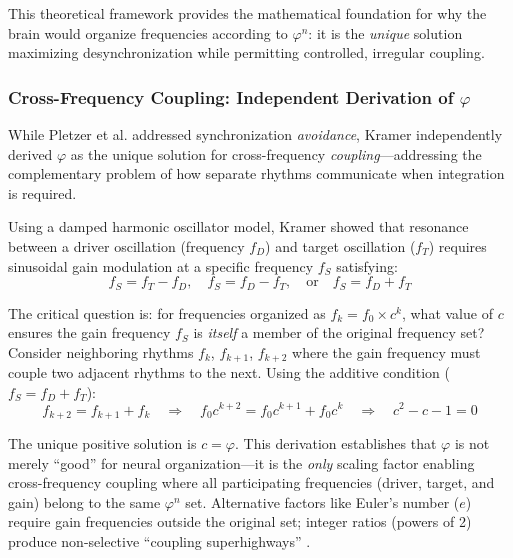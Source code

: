 \documentclass[11pt,a4paper]{article}
\newcommand{\phisym}{\varphi}
\begin{document}
This theoretical framework provides the mathematical foundation for why the brain would organize frequencies according to $\phisym^n$: it is the \textit{unique} solution maximizing desynchronization while permitting controlled, irregular coupling.

\subsubsection{Cross-Frequency Coupling: Independent Derivation of $\phisym$}

While Pletzer et al. addressed synchronization \textit{avoidance}, Kramer \parencite{kramer2022golden} independently derived $\phisym$ as the unique solution for cross-frequency \textit{coupling}---addressing the complementary problem of how separate rhythms communicate when integration is required.

Using a damped harmonic oscillator model, Kramer showed that resonance between a driver oscillation (frequency $f_D$) and target oscillation ($f_T$) requires sinusoidal gain modulation at a specific frequency $f_S$ satisfying:
\begin{equation}
f_S = f_T - f_D, \quad f_S = f_D - f_T, \quad \text{or} \quad f_S = f_D + f_T
\label{eq:kramer_resonance}
\end{equation}

The critical question is: for frequencies organized as $f_k = f_0 \times c^k$, what value of $c$ ensures the gain frequency $f_S$ is \textit{itself} a member of the original frequency set? Consider neighboring rhythms $f_k$, $f_{k+1}$, $f_{k+2}$ where the gain frequency must couple two adjacent rhythms to the next. Using the additive condition ($f_S = f_D + f_T$):
\begin{equation}
f_{k+2} = f_{k+1} + f_k \quad \Rightarrow \quad f_0 c^{k+2} = f_0 c^{k+1} + f_0 c^k \quad \Rightarrow \quad c^2 - c - 1 = 0
\end{equation}

The unique positive solution is $c = \phisym$. This derivation establishes that $\phisym$ is not merely ``good'' for neural organization---it is the \textit{only} scaling factor enabling cross-frequency coupling where all participating frequencies (driver, target, and gain) belong to the same $\phisym^n$ set. Alternative factors like Euler's number ($e$) require gain frequencies outside the original set; integer ratios (powers of 2) produce non-selective ``coupling superhighways'' \parencite{hoppensteadt1997weakly}.
\end{document}
